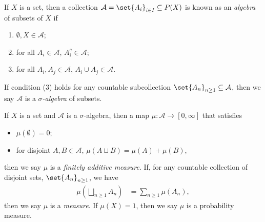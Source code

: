 \documentclass[10pt]{mypackage}
\begin{document}
\begin{definition}
  If $X$ is a set, then a collection $\mathcal{A} = \set{A_i}_{i\in I}\subseteq P(X)$ is known as an \textit{algebra} of subsets of $X$ if
  \begin{enumerate}[(1)]
    \item $\emptyset,X\in \mathcal{A}$;
    \item for all $A_i\in \mathcal{A}$, $A_i^{c}\in \mathcal{A}$;
    \item for all $A_i,A_j\in \mathcal{A}$, $A_i\cup A_j\in \mathcal{A}$.
  \end{enumerate}
  If condition (3) holds for any countable subcollection $\set{A_n}_{n\geq 1}\subseteq \mathcal{A}$, then we say $\mathcal{A}$ is a \textit{$\sigma$-algebra} of subsets.
\end{definition}
\begin{definition}[Measures]
  If $X$ is a set and $\mathcal{A}$ is a $\sigma$-algebra, then a map $\mu\colon \mathcal{A}\rightarrow [0,\infty]$ that satisfies
  \begin{itemize}
    \item $\mu\left( \emptyset \right) = 0$;
    \item for disjoint $A,B\in \mathcal{A}$, $\mu\left( A\sqcup B \right) = \mu\left( A \right) + \mu\left( B \right)$,
  \end{itemize}
  then we say $\mu$ is a \textit{finitely additive measure}. If, for any countable collection of disjoint sets, $\set{A_n}_{n\geq 1}$, we have
  \begin{align*}
    \mu\left( \bigsqcup_{n\geq 1}A_n \right) &= \sum_{n\geq 1}\mu\left( A_n \right),
  \end{align*}
  then we say $\mu$ is a \textit{measure}. If $\mu\left( X \right) = 1$, then we say $\mu$ is a probability measure.
\end{definition}
\end{document}
